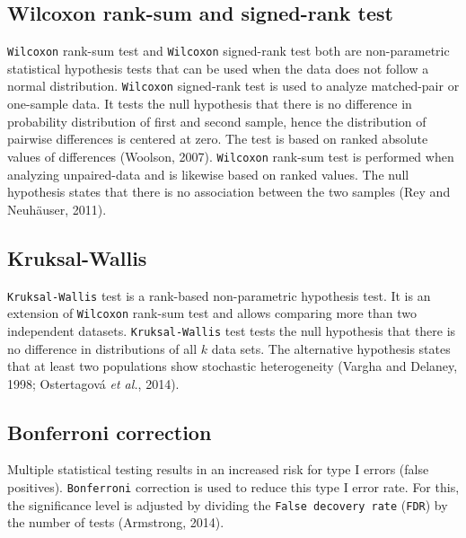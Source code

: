 \documentclass[
  parskip,
  oneside]{scrreprt}
\begin{document}
\hypertarget{wilcoxon-rank-sum-and-signed-rank-test}{%
\subsection{Wilcoxon rank-sum and signed-rank
test}\label{wilcoxon-rank-sum-and-signed-rank-test}}

\texttt{Wilcoxon} rank-sum test and \texttt{Wilcoxon} signed-rank test
both are non-parametric statistical hypothesis tests that can be used
when the data does not follow a normal distribution. \texttt{Wilcoxon}
signed-rank test is used to analyze matched-pair or one-sample data. It
tests the null hypothesis that there is no difference in probability
distribution of first and second sample, hence the distribution of
pairwise differences is centered at zero. The test is based on ranked
absolute values of differences (Woolson, 2007). \texttt{Wilcoxon}
rank-sum test is performed when analyzing unpaired-data and is likewise
based on ranked values. The null hypothesis states that there is no
association between the two samples (Rey and Neuhäuser, 2011).

\hypertarget{kruksal-wallis}{%
\subsection{Kruksal-Wallis}\label{kruksal-wallis}}

\texttt{Kruksal-Wallis} test is a rank-based non-parametric hypothesis
test. It is an extension of \texttt{Wilcoxon} rank-sum test and allows
comparing more than two independent datasets. \texttt{Kruksal-Wallis}
test tests the null hypothesis that there is no difference in
distributions of all \(k\) data sets. The alternative hypothesis states
that at least two populations show stochastic heterogeneity (Vargha and
Delaney, 1998; Ostertagová \emph{et al.}, 2014).

\hypertarget{bonferroni-correction}{%
\subsection{Bonferroni correction}\label{bonferroni-correction}}

Multiple statistical testing results in an increased risk for type I
errors (false positives). \texttt{Bonferroni} correction is used to
reduce this type I error rate. For this, the significance level is
adjusted by dividing the \texttt{False\ decovery\ rate} (\texttt{FDR})
by the number of tests (Armstrong, 2014).
\end{document}
